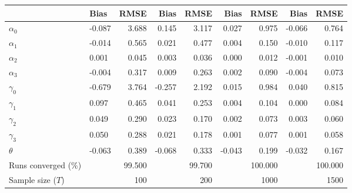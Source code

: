 
\begin{tabular}[t]{llrrrrrrr}
\toprule
  & Bias & RMSE & Bias & RMSE & Bias & RMSE & Bias & RMSE\\
\midrule
$\alpha_{0}$ & -0.087 & 3.688 & 0.145 & 3.117 & 0.027 & 0.975 & -0.066 & 0.764\\
$\alpha_{1}$ & -0.014 & 0.565 & 0.021 & 0.477 & 0.004 & 0.150 & -0.010 & 0.117\\
$\alpha_{2}$ & 0.001 & 0.045 & 0.003 & 0.036 & 0.000 & 0.012 & -0.001 & 0.010\\
$\alpha_{3}$ & -0.004 & 0.317 & 0.009 & 0.263 & 0.002 & 0.090 & -0.004 & 0.073\\
$\gamma_{0}$ & -0.679 & 3.764 & -0.257 & 2.192 & 0.015 & 0.984 & 0.040 & 0.815\\
$\gamma_{1}$ & 0.097 & 0.465 & 0.041 & 0.253 & 0.004 & 0.104 & 0.000 & 0.084\\
$\gamma_{2}$ & 0.049 & 0.290 & 0.023 & 0.170 & 0.002 & 0.073 & 0.003 & 0.060\\
$\gamma_{3}$ & 0.050 & 0.288 & 0.021 & 0.178 & 0.001 & 0.077 & 0.001 & 0.058\\
$\theta$ & -0.063 & 0.389 & -0.068 & 0.333 & -0.043 & 0.199 & -0.032 & 0.167\\
Runs converged (\%) &  & 99.500 &  & 99.700 &  & 100.000 &  & 100.000\\
Sample size ($T$) &  & 100 &  & 200 &  & 1000 &  & 1500\\
\bottomrule
\end{tabular}
